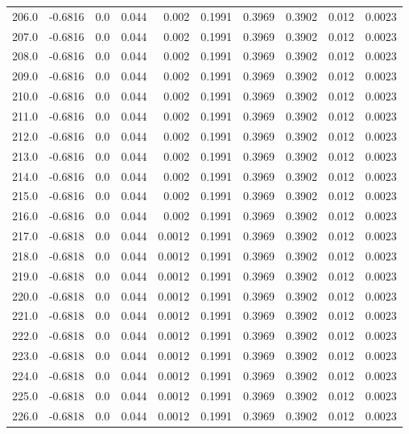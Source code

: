 \begin{longtable}{lrrrrrrrrr}
206.0 & -0.6816 & 0.0 & 0.044 & 0.002 & 0.1991 & 0.3969 & 0.3902 & 0.012 & 0.0023 \\
207.0 & -0.6816 & 0.0 & 0.044 & 0.002 & 0.1991 & 0.3969 & 0.3902 & 0.012 & 0.0023 \\
208.0 & -0.6816 & 0.0 & 0.044 & 0.002 & 0.1991 & 0.3969 & 0.3902 & 0.012 & 0.0023 \\
209.0 & -0.6816 & 0.0 & 0.044 & 0.002 & 0.1991 & 0.3969 & 0.3902 & 0.012 & 0.0023 \\
210.0 & -0.6816 & 0.0 & 0.044 & 0.002 & 0.1991 & 0.3969 & 0.3902 & 0.012 & 0.0023 \\
211.0 & -0.6816 & 0.0 & 0.044 & 0.002 & 0.1991 & 0.3969 & 0.3902 & 0.012 & 0.0023 \\
212.0 & -0.6816 & 0.0 & 0.044 & 0.002 & 0.1991 & 0.3969 & 0.3902 & 0.012 & 0.0023 \\
213.0 & -0.6816 & 0.0 & 0.044 & 0.002 & 0.1991 & 0.3969 & 0.3902 & 0.012 & 0.0023 \\
214.0 & -0.6816 & 0.0 & 0.044 & 0.002 & 0.1991 & 0.3969 & 0.3902 & 0.012 & 0.0023 \\
215.0 & -0.6816 & 0.0 & 0.044 & 0.002 & 0.1991 & 0.3969 & 0.3902 & 0.012 & 0.0023 \\
216.0 & -0.6816 & 0.0 & 0.044 & 0.002 & 0.1991 & 0.3969 & 0.3902 & 0.012 & 0.0023 \\
217.0 & -0.6818 & 0.0 & 0.044 & 0.0012 & 0.1991 & 0.3969 & 0.3902 & 0.012 & 0.0023 \\
218.0 & -0.6818 & 0.0 & 0.044 & 0.0012 & 0.1991 & 0.3969 & 0.3902 & 0.012 & 0.0023 \\
219.0 & -0.6818 & 0.0 & 0.044 & 0.0012 & 0.1991 & 0.3969 & 0.3902 & 0.012 & 0.0023 \\
220.0 & -0.6818 & 0.0 & 0.044 & 0.0012 & 0.1991 & 0.3969 & 0.3902 & 0.012 & 0.0023 \\
221.0 & -0.6818 & 0.0 & 0.044 & 0.0012 & 0.1991 & 0.3969 & 0.3902 & 0.012 & 0.0023 \\
222.0 & -0.6818 & 0.0 & 0.044 & 0.0012 & 0.1991 & 0.3969 & 0.3902 & 0.012 & 0.0023 \\
223.0 & -0.6818 & 0.0 & 0.044 & 0.0012 & 0.1991 & 0.3969 & 0.3902 & 0.012 & 0.0023 \\
224.0 & -0.6818 & 0.0 & 0.044 & 0.0012 & 0.1991 & 0.3969 & 0.3902 & 0.012 & 0.0023 \\
225.0 & -0.6818 & 0.0 & 0.044 & 0.0012 & 0.1991 & 0.3969 & 0.3902 & 0.012 & 0.0023 \\
226.0 & -0.6818 & 0.0 & 0.044 & 0.0012 & 0.1991 & 0.3969 & 0.3902 & 0.012 & 0.0023 \\

\end{longtable}
